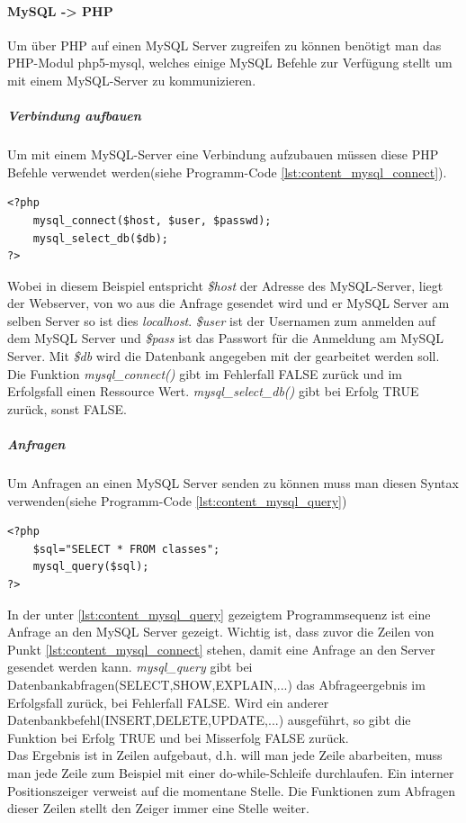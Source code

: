 \paragraph{MySQL -> PHP}
Um über PHP auf einen MySQL Server zugreifen zu können benötigt man das PHP-Modul php5-mysql, welches einige MySQL Befehle zur Verfügung stellt um mit einem MySQL-Server zu kommunizieren.\\
\subparagraph{Verbindung aufbauen}
Um mit einem MySQL-Server eine Verbindung aufzubauen müssen diese PHP Befehle verwendet werden(siehe Programm-Code \ref{lst:content_mysql_connect}).
\begin{lstlisting}[style=customPHP, caption={MySQL Connect},label={lst:content_mysql_connect}]
<?php 
	mysql_connect($host, $user, $passwd);
	mysql_select_db($db);
?>
\end{lstlisting}
Wobei in diesem Beispiel entspricht \textit{\$host} der Adresse des MySQL-Server, liegt der Webserver, von wo aus die Anfrage gesendet wird und er MySQL Server am selben Server so ist dies \textit{localhost}. \textit{\$user} ist der Usernamen zum anmelden auf dem MySQL Server und \textit{\$pass} ist das Passwort für die Anmeldung am MySQL Server. Mit \textit{\$db} wird die Datenbank angegeben mit der gearbeitet werden soll. Die Funktion \textit{mysql\_connect()} gibt im Fehlerfall FALSE zurück und im Erfolgsfall einen Ressource Wert. \textit{mysql\_select\_db()} gibt bei Erfolg TRUE zurück, sonst FALSE.
\subparagraph{Anfragen}
Um Anfragen an einen MySQL Server senden zu können muss man diesen Syntax verwenden(siehe Programm-Code \ref{lst:content_mysql_query})
\begin{lstlisting}[style=customPHP, caption={MySQL Querys},label={lst:content_mysql_query}]
<?php 
	$sql="SELECT * FROM classes";
	mysql_query($sql);
?>
\end{lstlisting}
In der unter \ref{lst:content_mysql_query} gezeigtem Programmsequenz ist eine Anfrage an den MySQL Server gezeigt. Wichtig ist, dass zuvor die Zeilen von Punkt \ref{lst:content_mysql_connect} stehen, damit eine Anfrage an den Server gesendet werden kann. \textit{mysql\_query} gibt bei Datenbankabfragen(SELECT,SHOW,EXPLAIN,...) das Abfrageergebnis im Erfolgsfall zurück, bei Fehlerfall FALSE. Wird ein anderer Datenbankbefehl(INSERT,DELETE,UPDATE,...) ausgeführt, so gibt die Funktion bei Erfolg TRUE und bei Misserfolg FALSE zurück.\\
Das Ergebnis ist in Zeilen aufgebaut, d.h. will man jede Zeile abarbeiten, muss man jede Zeile zum Beispiel mit einer do-while-Schleife durchlaufen. Ein interner Positionszeiger verweist auf die momentane Stelle. Die Funktionen zum Abfragen dieser Zeilen stellt den Zeiger immer eine Stelle weiter.\\

